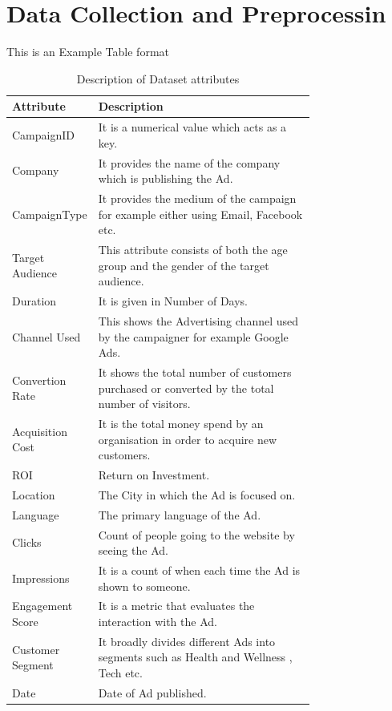 \section{Data Collection and Preprocessin}
This is an Example Table format 
\begin{table}[H]

\begin{tabular}{|l|>{\raggedright\arraybackslash}p{0.75\linewidth}|} \hline 
\textbf{Attribute} & \textbf{Description} \\
\hline
CampaignID & It is a numerical value which acts as a key.  \\
\hline
Company  & It provides the name of the company which is publishing the Ad. \\
\hline
CampaignType & It provides the medium of the campaign for example either using Email, Facebook etc.  \\
\hline
Target Audience  & This attribute consists of both the age group and the gender of the target audience. \\
\hline
Duration  & It is given in Number of Days.  \\
\hline
Channel Used  & This shows the Advertising channel used by the campaigner for example Google Ads. \\
\hline
Convertion Rate  & It shows the total number of customers purchased or converted by the total number of visitors. \\
\hline
Acquisition Cost  & It is the total money spend by an organisation in order to acquire new customers. \\
\hline
ROI  & Return on Investment.  \\
\hline
Location  & The City in which the Ad is focused on. \\
\hline
Language  & The primary language of the Ad. \\
\hline
Clicks  & Count of people going to the website by seeing the Ad. \\
\hline
Impressions  & It is a count of when each time the Ad is shown to someone. \\
\hline
Engagement Score  & It is a metric that evaluates the interaction with the Ad. \\
\hline
Customer Segment  & It broadly divides different Ads into segments such as Health and Wellness , Tech etc. \\
\hline
Date  & Date of Ad published. \\ \hline
\end{tabular}
\caption{Description of Dataset attributes}
    \label{tab:my_label}
\end{table}
